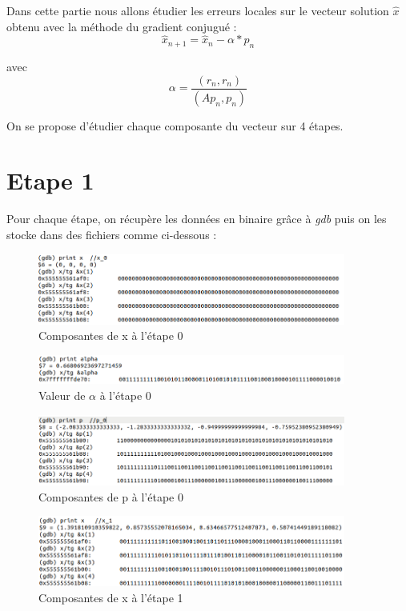 \documentclass[12,french]{report}
\begin{document}
Dans cette partie nous allons étudier les erreurs locales sur le vecteur solution $\hat{x}$ obtenu avec la méthode du gradient conjugué :
$$\hat{x}_{n+1}=\hat{x}_{n}-\alpha*p_n$$

avec
$$\alpha=\frac{(r_n,r_n)}{(Ap_n,p_n)}$$

On se propose d'étudier chaque composante du vecteur sur 4 étapes.

\section{Etape 1}

Pour chaque étape, on récupère les données en binaire grâce à \textit{gdb} puis on les stocke dans des fichiers comme ci-dessous :

\begin{figure}[H]
	\center
	\includegraphics[width=0.9\textwidth]{./Images/gdb_x_0}
	\caption{Composantes de x à l'étape 0}
\end{figure}

\begin{figure}[H]
	\center
	\includegraphics[width=0.9\textwidth]{./Images/gdb_alpha_0}
	\caption{Valeur de $\alpha$ à l'étape 0}
\end{figure}

\begin{figure}[H]
	\center
	\includegraphics[width=0.9\textwidth]{./Images/gdb_p_0}
	\caption{Composantes de p à l'étape 0}
\end{figure}

\begin{figure}[H]
	\center
	\includegraphics[width=0.9\textwidth]{./Images/gdb_x_1}
	\caption{Composantes de x à l'étape 1}
\end{figure}
\end{document}
